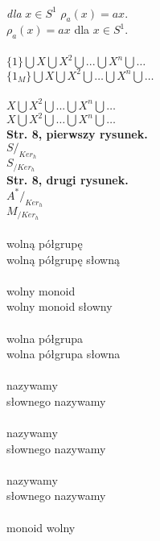 \documentclass[a4paper,11pt]{article}
\begin{document}
\vspace{\spaceTwo}


\noindent
{} \\
\Jest  \textit{dla} $x \in S^{ 1 }$ $\rho_{ a }( x )= a x$. \\
\Powin $\rho_{ a }( x ) = a x$ dla $x \in S^{ 1 }$. \\
 \\
\Jest  $\{ 1 \} \bigcup X \bigcup X^{ 2 } \bigcup ... \bigcup X^{ n } \bigcup \ldots$ \\
\Powin $\{ 1_{ M } \} \bigcup X \bigcup X^{ 2 } \bigcup \ldots \bigcup X^{ n } \bigcup \ldots$ \\
 \\
\Jest  $X \bigcup X^{ 2 } \bigcup ... \bigcup X^{ n } \bigcup \ldots$ \\
\Powin $X \bigcup X^{ 2 } \bigcup \ldots \bigcup X^{ n } \bigcup \ldots$ \\
\textbf{Str. 8, pierwszy rysunek.} \\
\Jest  $S /_{ Ker_{ h } }$ \\
\Powin $S_{ / Ker_{ h } }$ \\
\textbf{Str. 8, drugi rysunek.} \\
\Jest  $A^{ * } /_{ Ker_{ h } }$ \\
\Powin $M_{ / Ker_{ h } }$ \\
 \\
\Jest  wolną półgrupę \\
\Powin wolną półgrupę słowną \\
 \\
\Jest  wolny monoid \\
\Powin wolny monoid słowny \\
 \\
\Jest  wolna półgrupa \\
\Powin wolna półgrupa słowna \\
 \\
\Jest  nazywamy \\
\Powin słownego nazywamy \\
 \\
\Jest  nazywamy \\
\Powin słownego nazywamy \\
 \\
\Jest  nazywamy \\
\Powin słownego nazywamy \\
 \\
\Jest  monoid wolny \\
\end{document}
